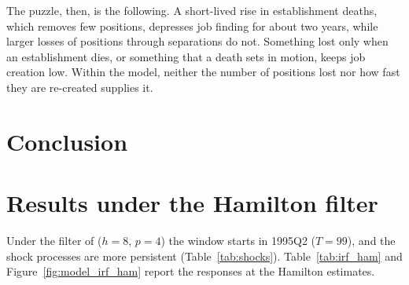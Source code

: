 \documentclass[authoryear, review, 12pt]{elsarticle}
\begin{document}
The puzzle, then, is the following. A short-lived rise in establishment deaths, which removes few positions, depresses job finding for about two years, while larger losses of positions through separations do not. Something lost only when an establishment dies, or something that a death sets in motion, keeps job creation low. Within the model, neither the number of positions lost nor how fast they are re-created supplies it.

\section{Conclusion}\label{sec:conclusion}


\appendix

\section{Results under the Hamilton filter}\label{app:filters}

Under the filter of \citet{hamilton_2018} ($h=8$, $p=4$) the window starts in 1995Q2 ($T=99$), and the shock processes are more persistent (Table~\ref{tab:shocks}). Table~\ref{tab:irf_ham} and Figure~\ref{fig:model_irf_ham} report the responses at the Hamilton estimates.
\end{document}
